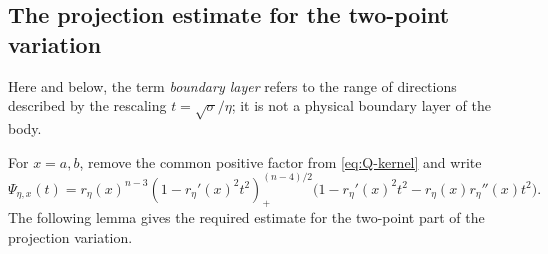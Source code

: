 \documentclass[11pt]{article}
\theoremstyle{remark}
\newcommand{\pos}[1]{(#1)_{+}}
\begin{document}
\subsection{The projection estimate for the two-point variation}

Here and below, the term \emph{boundary layer} refers to the range of
directions described by the rescaling $t=\sqrt{\sigma}/\eta$; it is not a
physical boundary layer of the body.

For $x=a,b$, remove the common positive factor from
\eqref{eq:Q-kernel} and write
\begin{equation}\label{eq:Psi-eta}
 \Psi_{\eta,x}(t)=r_\eta(x)^{n-3}
 \pos{1-r_\eta'(x)^2t^2}^{(n-4)/2}
 \bigl(1-r_\eta'(x)^2t^2-r_\eta(x)r_\eta''(x)t^2\bigr).
\end{equation}
The following lemma gives the required estimate for the two-point part of
the projection variation.
\end{document}
